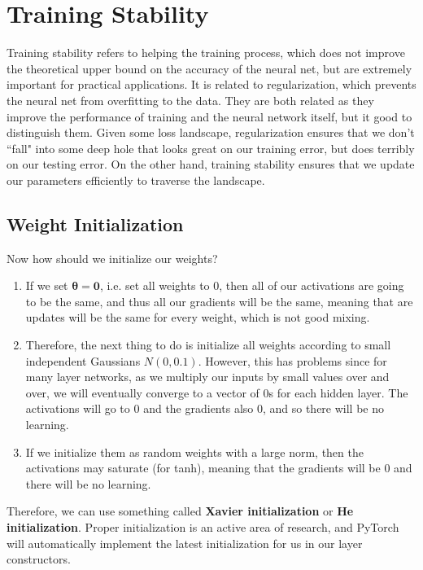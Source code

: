 \documentclass{article}
\theoremstyle{definition}
\theoremstyle{remark}
\theoremstyle{definition}
\begin{document}
\section{Training Stability}

  Training stability refers to helping the training process, which does not improve the theoretical upper bound on the accuracy of the neural net, but are extremely important for practical applications. It is related to regularization, which prevents the neural net from overfitting to the data. They are both related as they improve the performance of training and the neural network itself, but it good to distinguish them. Given some loss landscape, regularization ensures that we don't ``fall" into some deep hole that looks great on our training error, but does terribly on our testing error. On the other hand, training stability ensures that we update our parameters efficiently to traverse the landscape. 

  \subsection{Weight Initialization}

    Now how should we initialize our weights? 
    \begin{enumerate}
      \item If we set $\boldsymbol{\theta} = \mathbf{0}$, i.e. set all weights to $0$, then all of our activations are going to be the same, and thus all our gradients will be the same, meaning that are updates will be the same for every weight, which is not good mixing. 
      \item Therefore, the next thing to do is initialize all weights according to small independent Gaussians $N(0, 0.1)$. However, this has problems since for many layer networks, as we multiply our inputs by small values over and over, we will eventually converge to a vector of $0$s for each hidden layer. The activations will go to $0$ and the gradients also $0$, and so there will be no learning. 
      \item If we initialize them as random weights with a large norm, then the activations may saturate (for tanh), meaning that the gradients will be $0$ and there will be no learning. 
    \end{enumerate}
    Therefore, we can use something called \textbf{Xavier initialization} or \textbf{He initialization}. Proper initialization is an active area of research, and PyTorch will automatically implement the latest initialization for us in our layer constructors. 
\end{document}

